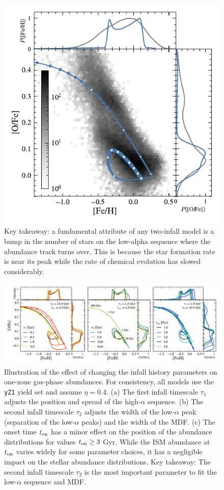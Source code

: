 \documentclass[twocolumn,twocolappendix,linenumbers]{aastex631}
\begin{document}
\begin{figure}
    \centering
    \includegraphics{figures/onezone_sfr.pdf}
    \caption{Key takeaway: a fundamental attribute of any two-infall model is a bump in the number of stars on the low-alpha sequence where the abundance track turns over. This is because the star formation rate is near its peak while the rate of chemical evolution has slowed considerably.}
    \label{fig:onezone-sfr}
\end{figure}

\begin{figure}
    \centering
    \includegraphics{figures/onezone_params.pdf}
    \caption{Illustration of the effect of changing the infall history parameters on one-zone gas-phase abundances. For consistency, all models use the {\tt yZ1} yield set and assume $\eta=0.4$. (a) The first infall timescale $\tau_1$ adjusts the position and spread of the high-$\alpha$ sequence. (b) The second infall timescale $\tau_2$ adjusts the width of the low-$\alpha$ peak (separation of the low-$\alpha$ peaks) and the width of the MDF. (c) The onset time $t_{\rm on}$ has a minor effect on the position of the abundance distributions for values $t_{\rm on}\ge 3$ Gyr. While the ISM abundance at $t_{\rm on}$ varies widely for some parameter choices, it has a negligible impact on the stellar abundance distributions. Key takeaway: The second infall timescale $\tau_2$ is the most important parameter to fit the low-$\alpha$ sequence and MDF.}
    \label{fig:twoinfall-parameters-low-yields}
\end{figure}
\end{document}
